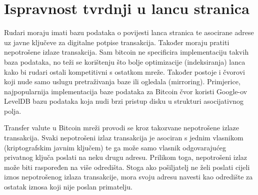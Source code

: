 \documentclass[utf8, zavrsni]{fer}
\begin{document}
\section{Ispravnost tvrdnji u lancu stranica}
Rudari moraju imati bazu podataka o povijesti lanca stranica te asocirane adrese uz javne ključeve za digitalne potpise transakcija\footnotemark. Također moraju pratiti nepotrošene izlaze transakcija. Sam bitcoin ne specificira implementaciju takvih baza podataka, no teži se korištenju što bolje optimizacije (indeksiranja) lanca kako bi rudari ostali kompetitivni s ostatkom mreže. Također postoje i čvorovi koji nude samo uslugu pretraživanja baze ili ogledala (mirroring). Primjerice, najpopularnija implementacija baze podataka za Bitcoin čvor koristi Google-ov LevelDB bazu podataka koja nudi brzi pristup disku u strukturi asocijativnog polja.

Transfer valute u Bitcoin mreži provodi se kroz takozvane nepotrošene izlaze transakcija\footnotemark. Svaki nepotrošeni izlaz transakcija je asociran s jednim vlasnikom (kriptografskim javnim ključem) te ga može samo vlasnik odgovarajućeg privatnog ključa poslati na neku drugu adresu. Prilikom toga, nepotrošeni izlaz može biti raspoređen na više odredišta. Stoga ako pošiljatelj ne želi poslati cijeli iznos nepotrošenog izlaza transakcije, mora svoju adresu navesti kao odredište za ostatak iznosa koji nije poslan primatelju.
\end{document}
